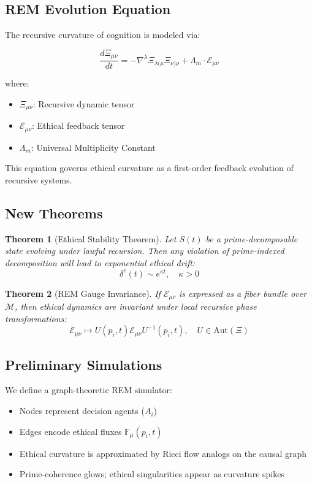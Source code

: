 \documentclass{article}
\theoremstyle{plain}
\newtheorem{theorem}{Theorem}
\begin{document}
\subsection{REM Evolution Equation}

The recursive curvature of cognition is modeled via:

\[
\frac{d \Xi_{\mu\nu}}{dt} = -\nabla^\lambda \Xi_{\lambda(\mu} \Xi_{\nu)\rho} + \Lambda_m \cdot \mathcal{E}_{\mu\nu}
\]

where:
\begin{itemize}
  \item $\Xi_{\mu\nu}$: Recursive dynamic tensor
  \item $\mathcal{E}_{\mu\nu}$: Ethical feedback tensor
  \item $\Lambda_m$: Universal Multiplicity Constant
\end{itemize}

This equation governs ethical curvature as a first-order feedback evolution of recursive systems.

\subsection{New Theorems}

\begin{theorem}[Ethical Stability Theorem]
Let $S(t)$ be a prime-decomposable state evolving under lawful recursion. Then any violation of prime-indexed decomposition will lead to exponential ethical drift:
\[
\delta^e(t) \sim e^{\kappa t}, \quad \kappa > 0
\]
\end{theorem}

\begin{theorem}[REM Gauge Invariance]
If $\mathcal{E}_{\mu\nu}$ is expressed as a fiber bundle over $\mathcal{M}$, then ethical dynamics are invariant under local recursive phase transformations:
\[
\mathcal{E}_{\mu\nu} \mapsto U(p_i, t) \mathcal{E}_{\mu\nu} U^{-1}(p_i, t), \quad U \in \text{Aut}(\Xi)
\]
\end{theorem}

\subsection{Preliminary Simulations}

We define a graph-theoretic REM simulator:
\begin{itemize}
  \item Nodes represent decision agents ($A_i$)
  \item Edges encode ethical fluxes $\mathbb{F}_{\mu}(p_i, t)$
  \item Ethical curvature is approximated by Ricci flow analogs on the causal graph
  \item Prime-coherence glows; ethical singularities appear as curvature spikes
\end{itemize}
\end{document}
